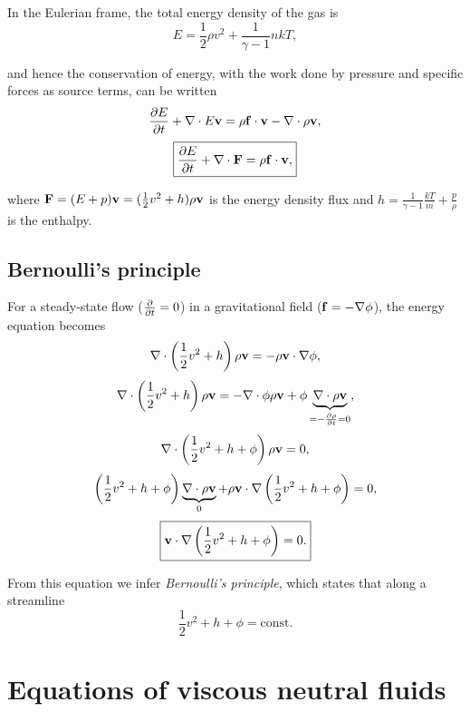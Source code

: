 \documentclass[../ay202_class_notes.tex]{subfiles}
\begin{document}
In the Eulerian frame, the total energy density of the gas is 
\begin{equation}
E = \frac{1}{2} \rho v^2 + \frac{1}{\gamma - 1} n k T,
\end{equation}

\noindent and hence the conservation of energy, with the work done by pressure and specific forces as source terms, can be written 
\begin{equation}
\frac{\partial E}{\partial t} + \nabla \cdot E \mathbf{v} = \rho \mathbf{f} \cdot \mathbf{v} - \nabla \cdot \rho \mathbf{v},
\end{equation}
\begin{equation}
\boxed{\frac{\partial E}{\partial t} + \nabla \cdot \mathbf{F} = \rho \mathbf{f} \cdot \mathbf{v},}
\end{equation}

\noindent where $\mathbf{F} = (E + p) \mathbf{v} = (\frac{1}{2} v^2 + h) \rho \mathbf{v}$ is the energy density flux and $h = \frac{1}{\gamma - 1} \frac{kT}{m} + \frac{p}{\rho}$ is the enthalpy.

\subsection{Bernoulli's principle}
For a steady-state flow ($\frac{\partial }{\partial t} = 0$) in a gravitational field ($\mathbf{f} = - \nabla \phi$), the energy equation becomes
\begin{equation}
\nabla \cdot \left(\frac{1}{2} v^2 + h \right) \rho \mathbf{v} = -\rho \mathbf{v} \cdot \nabla \phi,
\end{equation}
\begin{equation}
\nabla \cdot \left(\frac{1}{2} v^2 + h \right) \rho \mathbf{v} = -\nabla \cdot \phi \rho \mathbf{v} + \phi \underbrace{\nabla \cdot \rho \mathbf{v}}_{= - \frac{\partial \rho}{\partial t} = 0},
\end{equation}
\begin{equation}
\nabla \cdot \left(\frac{1}{2} v^2 + h + \phi \right) \rho \mathbf{v} = 0,
\end{equation}
\begin{equation}
\left(\frac{1}{2} v^2 + h + \phi \right) \underbrace{\nabla \cdot \rho \mathbf{v}}_{0} + \rho \mathbf{v} \cdot \nabla \left(\frac{1}{2} v^2 + h + \phi \right) = 0,
\end{equation}
\begin{equation}
\boxed{\mathbf{v} \cdot \nabla \left(\frac{1}{2} v^2 + h + \phi \right) = 0.}
\end{equation}

\noindent  From this equation we infer \emph{Bernoulli's principle}, which states that along a streamline
\begin{equation}
\boxed{\frac{1}{2} v^2 + h + \phi = \text{const.}}
\end{equation}

\section{Equations of viscous neutral fluids}
\end{document}
